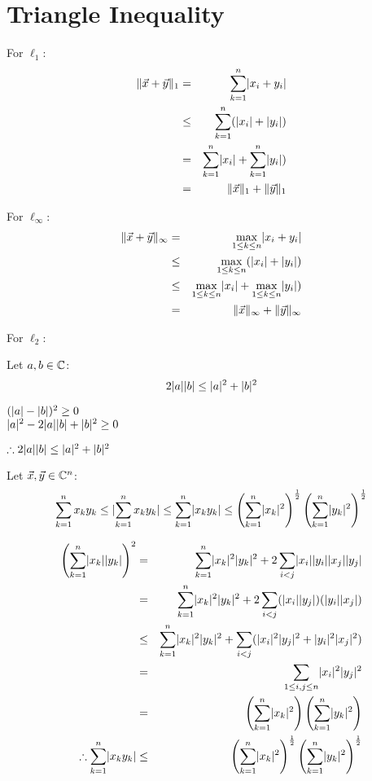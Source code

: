 \documentclass[letterpaper,12pt,fleqn]{article}
\newcommand{\norm}[1]{\|#1\|}
\newcommand{\vx}{\vec{x}}
\newcommand{\vy}{\vec{y}}
\begin{document}
\section*{Triangle Inequality}

For $\ell_1$:
\begin{eqnarray*}
  \norm{\vx+\vy}_1 &=& \sum_{k=1}^n\abs{x_i+y_i} \\
  &\le& \sum_{k=1}^n(\abs{x_i}+\abs{y_i}) \\
  &=& \sum_{k=1}^n\abs{x_i}+\sum_{k=1}^n\abs{y_i}) \\
  &=& \norm{\vx}_1+\norm{\vy}_1
\end{eqnarray*}

For $\ell_{\infty}$:
\begin{eqnarray*}
  \norm{\vx+\vy}_{\infty} &=& \max_{1\le k\le n}\abs{x_i+y_i} \\
  &\le& \max_{1\le k\le n}(\abs{x_i}+\abs{y_i}) \\
  &\le& \max_{1\le k\le n}\abs{x_i}+\max_{1\le k\le n}\abs{y_i}) \\
  &=& \norm{\vx}_{\infty}+\norm{\vy}_{\infty}
\end{eqnarray*}

For $\ell_2$:

\begin{lemma}
  Let $a,b\in\mathbb{C}$:
  \[2\lvert a\rvert\lvert b\rvert\le\lvert a\rvert^2+\lvert b\rvert^2\]
\end{lemma}

\begin{theproof}
  $(\lvert a\rvert-\lvert b\rvert)^2\ge 0$ \\
  $\lvert a\rvert^2-2\lvert a\rvert\lvert b\rvert+\lvert b\rvert^2\ge 0$
  
  $\therefore 2\lvert a\rvert\lvert b\rvert\le\lvert a\rvert^2+\lvert b\rvert^2$
\end{theproof}

\begin{theorem}
  Let $\vx,\vy\in\C^n$:
  \[\sum_{k=1}^nx_ky_k\le\lvert\sum_{k=1}^nx_ky_k\rvert\le\sum_{k=1}^n\lvert x_ky_k\rvert\le
  \left(\sum_{k=1}^n\lvert x_k\rvert^2\right)^{\frac{1}{2}}
  \left(\sum_{k=1}^n\lvert y_k\rvert^2\right)^{\frac{1}{2}}\]
\end{theorem}

\begin{theproof}
  \listbreak
  \begin{eqnarray*}
    \left(\sum_{k=1}^n\lvert x_k\rvert\lvert y_k\rvert\right)^2 &=&
    \sum_{k=1}^n\lvert x_k\rvert^2\lvert y_k\rvert^2+
    2\sum_{i<j}\lvert x_i\rvert\lvert y_i\rvert\lvert x_j\rvert\lvert y_j\rvert \\
    &=& \sum_{k=1}^n\lvert x_k\rvert^2\lvert y_k\rvert^2+
    2\sum_{i<j}(\lvert x_i\rvert\lvert y_j\rvert)(\lvert y_i\rvert\lvert x_j\rvert) \\
    &\le& \sum_{k=1}^n\lvert x_k\rvert^2\lvert y_k\rvert^2+
    \sum_{i<j}(\lvert x_i\rvert^2\lvert y_j\rvert^2+\lvert y_i\rvert^2\lvert x_j\rvert^2) \\
    &=& \sum_{1\le i,j\le n}\lvert x_i\rvert^2\lvert y_j\rvert^2 \\
    &=& \left(\sum_{k=1}^n\lvert x_k\rvert^2\right)
    \left(\sum_{k=1}^n\lvert y_k\rvert^2\right) \\
    \therefore \sum_{k=1}^n\lvert x_ky_k\rvert &\le&
    \left(\sum_{k=1}^n\lvert x_k\rvert^2\right)^{\frac{1}{2}}
    \left(\sum_{k=1}^n\lvert y_k\rvert^2\right)^{\frac{1}{2}}
  \end{eqnarray*}
\end{theproof}
\end{document}
